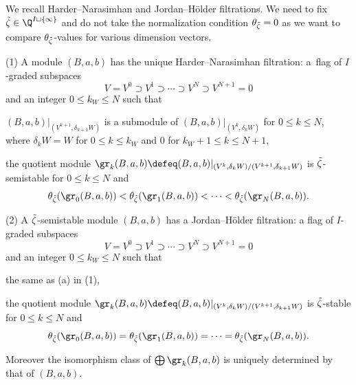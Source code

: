We recall Harder--Narasimhan and Jordan--H\"older f\/iltrations. We need
to f\/ix $\Tilde\zeta\in \Q^{I\sqcup\{\infty\}}$ and do not take the
normalization condition $\theta_{\Tilde\zeta} = 0$ as we want to
compare $\theta_{\Tilde\zeta}$-values for various dimension vectors.

\begin{Theorem}\label{thm:Rudakov}
\textup{(1)} A module $(B,a,b)$ has the unique Harder--Narasimhan
filtration\textup:
a~flag of $I$-graded subspaces
\begin{equation*}
  V = V^0 \supset V^1 \supset \cdots \supset V^N \supset V^{N+1} = 0
\end{equation*}
and an integer $0 \le k_W \le N$ such that
\begin{aenume}\itemsep=0pt
\item $(B,a,b)|_{(V^{k+1}, \delta_{k+1} W)}$ is a submodule of
  $(B,a,b)|_{(V^k,\delta_k W)}$ for $0\le k \le N$,
where $\delta_k W = W$ for $0\le k\le k_W$ and $0$
for $k_W + 1\le k \le N+1$,

\item the quotient module $\gr_k (B,a,b) \defeq
  (B,a,b)|_{(V^k,\delta_k W)/(V^{k+1},\delta_{k+1} W)}$ is
  $\Tilde\zeta$-semistable for $0\le k\le N$ and
\[
    \theta_{\Tilde\zeta}(\gr_0(B,a,b))
    < \theta_{\Tilde\zeta}(\gr_1(B,a,b)) < \cdots
    < \theta_{\Tilde\zeta}(\gr_N(B,a,b)).
\]
\end{aenume}

\textup{(2)} A $\Tilde\zeta$-semistable module $(B,a,b)$ has a
Jordan--H\"older filtration\textup:
a f\/lag of $I$-graded subspaces
\begin{equation*}
  V = V^0 \supset V^1 \supset \cdots \supset V^N \supset V^{N+1} = 0
\end{equation*}
and an integer $0 \le k_W \le N$ such that
\begin{aenume}\itemsep=0pt
\item the same as \textup{(a)} in \textup{(1)},

\item the quotient module $\gr_k (B,a,b)\defeq (B,a,b)|_{(V^k,\delta_k
    W)/(V^{k+1},\delta_{k+1} W)}$ is $\Tilde\zeta$-stable for $0\le
  k\le N$ and
\[
    \theta_{\Tilde\zeta}(\gr_0(B,a,b))
    = \theta_{\Tilde\zeta}(\gr_1(B,a,b)) = \cdots
    = \theta_{\Tilde\zeta}(\gr_N(B,a,b)).
\]
\end{aenume}
Moreover the isomorphism class of $\bigoplus \gr_k(B,a,b)$ is uniquely
determined by that of $(B,a,b)$.
\end{Theorem}

